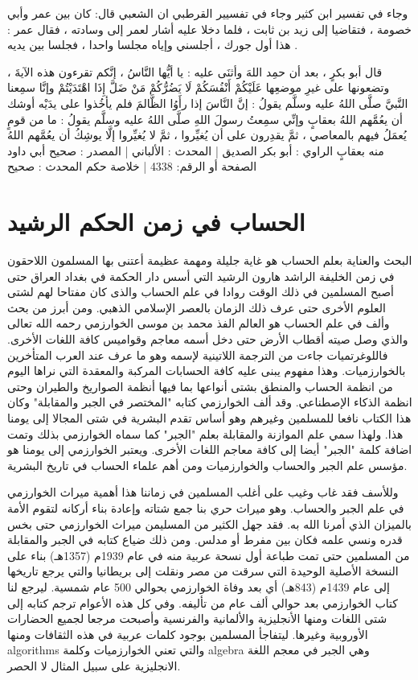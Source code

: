 وجاء في تفسير ابن كثير 
وجاء في تفسيير القرطبي ان الشعبي قال: كان بين عمر وأبي خصومة ، فتقاضيا إلى زيد بن ثابت ، فلما دخلا عليه أشار لعمر إلى وسادته ، فقال عمر : هذا أول جورك ، أجلسني وإياه مجلسا واحدا ، فجلسا بين يديه .

قال أبو بكرٍ ، بعد أن حمِد اللهَ وأثنَى عليه : يا أيُّها النَّاسُ ، إنَّكم تقرءون هذه الآيةَ ، وتضعونها على غيرِ موضعِها عَلَيْكُمْ أَنْفُسَكُمْ لَا يَضُرُّكُمْ مَنْ ضَلَّ إِذَا اهْتَدَيْتُمْ وإنَّا سمِعنا النَّبيَّ صلَّى اللهُ عليه وسلَّم يقولُ : إنَّ النَّاسَ إذا رأَوُا الظَّالمَ فلم يأخُذوا على يدَيْه أوشك أن يعُمَّهم اللهُ بعقابٍ وإنِّي سمِعتُ رسولَ اللهِ صلَّى اللهُ عليه وسلَّم يقولُ : ما من قومٍ يُعمَلُ فيهم بالمعاصي ، ثمَّ يقدِرون على أن يُغيِّروا ، ثمَّ لا يُغيِّروا إلَّا يوشِكُ أن يعُمَّهم اللهُ منه بعقابٍ
الراوي : أبو بكر الصديق | المحدث : الألباني | المصدر : صحيح أبي داود
الصفحة أو الرقم: 4338 | خلاصة حكم المحدث : صحيح





\section{الحساب في زمن الحكم الرشيد}
البحث والعناية بعلم الحساب هو غاية جليلة ومهمة عظيمة أعتنى بها المسلمون اللاحقون في زمن الخليفة الراشد هارون الرشيد التي أسس دار الحكمة في بغداد العراق حتى أصبح المسلمين في ذلك الوقت روادا في علم الحساب والذى كان مفتاحا لهم لشتى العلوم الأخرى حتى عرف ذلك الزمان بالعصر الإسلامي الذهبي. ومن أبرز من بحث وألف في علم الحساب هو العالم الفذ محمد بن موسى الخوارزمي رحمه الله تعالى والذي وصل صيته أقطاب الأرض حتى دخل أسمه معاجم وقواميس كافة اللغات الأخرى. فاللوغرتميات جاءت من الترجمة اللاتينية لإسمه وهو ما عرف عند العرب المتأخرين بالخوارزميات. وهذا مفهوم يبنى عليه كافة الحسابات المركبة والمعقدة التي نراها اليوم من انظمة الحساب والمنطق بشتى أنواعها بما فيها أنظمة الصواريخ والطيران وحتى انظمة الذكاء الإصطناعي. وقد ألف الخوارزمي كتابه "المختصر في الجبر والمقابلة" وكان هذا الكتاب نافعا للمسلمين وغيرهم وهو أساس تقدم البشرية في شتى المجالا إلى يومنا هذا. ولهذا سمي علم الموازنة والمقابلة بعلم "الجبر" كما سماه الخوارزمي بذلك وتمت اضافة كلمة "الجبر" أيضا إلى كافة معاجم اللغات الأخرى. ويعتبر الخوارزمي إلى يومنا هو مؤسس علم الجبر والحساب والخوارزميات ومن أهم علماء الحساب في تاريخ البشرية.

وللأسف فقد غاب وغيب على أغلب المسلمين في زماننا هذا أهمية ميراث الخوارزمي في علم الجبر والحساب. وهو ميراث حري بنا جمع شتاته وإعادة بناء أركانه لتقوم الأمة بالميزان الذي أمرنا الله به. فقد جهل الكثير من المسليمن ميراث الخوارزمي حتى بخس قدره ونسي علمه فكان بين مفرط أو مدلس. ومن ذلك ضياع كتابه في الجبر والمقابلة من المسلمين حتى تمت طباعة أول نسحة عربية منه في عام 1939م (1357هـ) بناء على النسخة الأصلية الوحيدة التي سرقت من مصر ونقلت إلى بريطانيا والتي يرجع تاريخها إلى عام 1439م (843هـ) أي بعد وفاة الخوارزمي بحوالي 500 عام شمسية.
ليرجع لنا كتاب الخوارزمي بعد حوالي ألف عام من تأليفه.
وفي كل هذه الأعوام ترجم كتابه إلى شتى اللغات ومنها الأنجليزية والألمانية والفرنسية وأصبحت مرجعا لجميع الحضارات الأوروبية وغيرها.
ليتفاجأ المسلمين بوجود كلمات عربية في هذه الثقافات ومنها algorithms والتي تعني الخوارزميات وكلمة algebra وهي الجبر في معجم اللغة الانجليزية على سبيل المثال لا الحصر.

